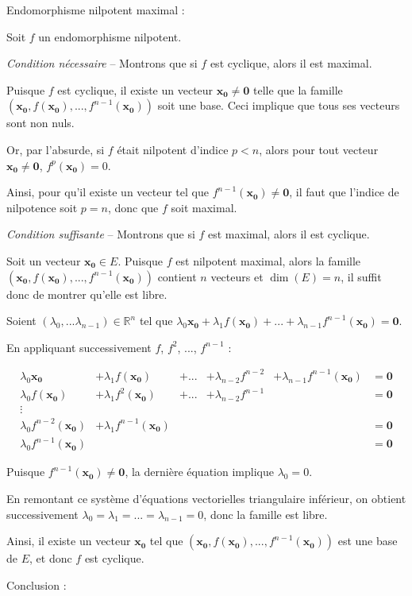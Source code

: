 \documentclass[10pt,a4paper]{article}
\begin{document}
\q Endomorphisme nilpotent maximal :

Soit $f$ un endomorphisme nilpotent.

\textit{Condition nécessaire} -- Montrons que si $f$ est cyclique, alors il est maximal.

Puisque $f$ est cyclique, il existe un vecteur \(\mathbf{x_0} \neq \mathbf{0}\) telle que la famille
\((\mathbf{x_0},f(\mathbf{x_0}), ..., f^{n-1}(\mathbf{x_0}))\) soit une base. Ceci implique que tous
ses vecteurs sont non nuls.

Or, par l'absurde, si \(f\) était nilpotent d'indice \(p < n\), alors pour tout vecteur
\(\mathbf{x_0} \neq \mathbf{0}\), \(f^p(\mathbf{x_0}) = 0\).

Ainsi, pour qu'il existe un vecteur tel que \(f^{n-1}(\mathbf{x_0}) \neq \mathbf{0}\), il faut que
l'indice de nilpotence soit \(p = n\), donc que \(f\) soit maximal.

\textit{Condition suffisante} -- Montrons que si \(f\) est maximal, alors il est cyclique.

Soit un vecteur \(\mathbf{x_0} \in E\). Puisque $f$ est nilpotent maximal, alors la famille
\((\mathbf{x_0},f(\mathbf{x_0}), ..., f^{n-1}(\mathbf{x_0}))\) contient \(n\) vecteurs et \(\dim(E)
= n\), il suffit donc de montrer qu'elle est libre.

Soient \((\lambda_0, ...\lambda_{n-1}) \in \mathbb{R}^n\) tel que \(\lambda_0\mathbf{x_0} +
\lambda_1 f(\mathbf{x_0}) + ... + \lambda_{n-1} f^{n-1}(\mathbf{x_0}) = \mathbf{0}\).

En appliquant successivement \(f\), \(f^2\), ..., \(f^{n-1}\) :

\[
\begin{aligned}
\lambda_0\mathbf{x_0} & + \lambda_1 f(\mathbf{x_0}) & + ... & + \lambda_{n-2} f^{n-2} & + \lambda_{n-1} f^{n-1}(\mathbf{x_0}) & = \mathbf{0}\\
\lambda_0f(\mathbf{x_0}) & + \lambda_1 f^2(\mathbf{x_0}) & + ... & + \lambda_{n-2} f^{n-1} & & = \mathbf{0}\\
\vdots \\
\lambda_0 f^{n-2}(\mathbf{x_0}) &+ \lambda_1 f^{n-1}(\mathbf{x_0}) & & & & = \mathbf{0}\\
\lambda_0 f^{n-1}(\mathbf{x_0}) & & & & & = \mathbf{0}
\end{aligned}
\]

Puisque \(f^{n-1}(\mathbf{x_0}) \neq \mathbf{0}\), la dernière équation implique \(\lambda_0 = 0\).

En remontant ce système d'équations vectorielles triangulaire inférieur, on obtient successivement
\(\lambda_0 = \lambda_1 = ... = \lambda_{n-1} = 0\), donc la famille est libre.

Ainsi, il existe un vecteur \(\mathbf{x_0}\) tel que \((\mathbf{x_0},f(\mathbf{x_0}),...,
f^{n-1}(\mathbf{x_0}))\) est une base de \(E\), et donc \(f\) est cyclique.

Conclusion : 
\end{document}
